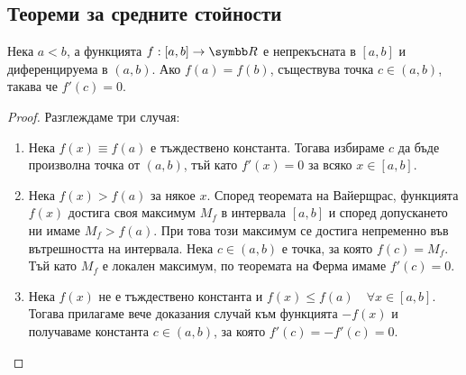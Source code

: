 \documentclass[
  headings=standardclasses,
  bibliography=totocnumbered,
]{scrartcl}
\begin{document}
\subsection{Теореми за средните стойности}

\begin{theorem}[Рол]
  Нека \( a < b \), а функцията \( f: [a, b] \to \R \) е непрекъсната в \( [a, b] \) и диференцируема в \( (a, b) \). Ако \( f(a) = f(b) \), съществува точка \( c \in (a, b) \), такава че \( f'(c) = 0 \).
\end{theorem}
\begin{proof}
  Разглеждаме три случая:
  \begin{enumerate}
    \item Нека \( f(x) \equiv f(a) \) е тъждествено константа. Тогава избираме \( c \) да бъде произволна точка от \( (a, b) \), тъй като \( f'(x) = 0 \) за всяко \( x \in [a, b] \).
    \item Нека \( f(x) > f(a) \) за някое \( x \). Според теоремата на Вайерщрас, функцията \( f(x) \) достига своя максимум \( M_f \) в интервала \( [a, b] \) и според допускането ни имаме \( M_f > f(a) \). При това този максимум се достига непременно във вътрешността на интервала. Нека \( c \in (a, b) \) е точка, за която \( f(c) = M_f \). Тъй като \( M_f \) е локален максимум, по теоремата на Ферма имаме \( f'(c) = 0 \).
    \item Нека \( f(x) \) не е тъждествено константа и \( f(x) \leq f(a)\quad\forall x \in [a, b] \). Тогава прилагаме вече доказания случай към функцията \( -f(x) \) и получаваме константа \( c \in (a, b) \), за която \( f'(c) = -f'(c) = 0 \).
  \end{enumerate}
\end{proof}
\end{document}
